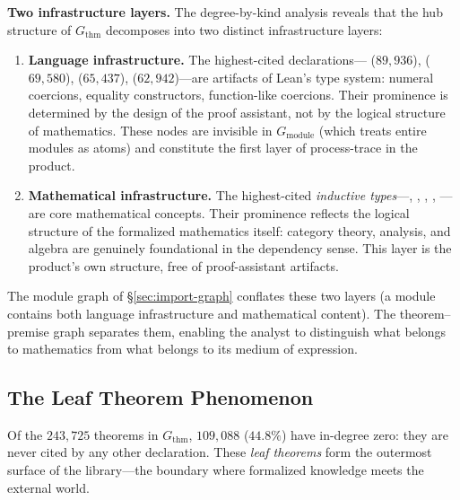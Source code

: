 \noindent\textbf{Two infrastructure layers.}
\label{rem:two-layers}
The degree-by-kind analysis reveals that the hub structure of $G_{\mathrm{thm}}$ decomposes into two distinct infrastructure layers:
\begin{enumerate}
\item \textbf{Language infrastructure.} The highest-cited declarations--- ($89{,}936$),  ($69{,}580$),  ($65{,}437$),  ($62{,}942$)---are artifacts of Lean's type system: numeral coercions, equality constructors, function-like coercions. Their prominence is determined by the design of the proof assistant, not by the logical structure of mathematics. These nodes are invisible in $G_{\mathrm{module}}$ (which treats entire modules as atoms) and constitute the first layer of process-trace in the product.

\item \textbf{Mathematical infrastructure.} The highest-cited \emph{inductive types}---, , , , ---are core mathematical concepts. Their prominence reflects the logical structure of the formalized mathematics itself: category theory, analysis, and algebra are genuinely foundational in the dependency sense. This layer is the product's own structure, free of proof-assistant artifacts.
\end{enumerate}
The module graph of \S\ref{sec:import-graph} conflates these two layers (a module contains both language infrastructure and mathematical content). The theorem--premise graph separates them, enabling the analyst to distinguish what belongs to mathematics from what belongs to its medium of expression.

\subsection{The Leaf Theorem Phenomenon}
\label{sec:thm-leaves}

Of the $243{,}725$ theorems in $G_{\mathrm{thm}}$, $109{,}088$ ($44.8\%$) have in-degree zero: they are never cited by any other declaration. These \emph{leaf theorems} form the outermost surface of the library---the boundary where formalized knowledge meets the external world.

